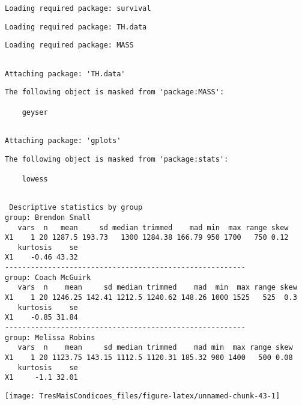 \documentclass[]{article}
\begin{document}
\begin{verbatim}
Loading required package: survival
\end{verbatim}

\begin{verbatim}
Loading required package: TH.data
\end{verbatim}

\begin{verbatim}
Loading required package: MASS
\end{verbatim}

\begin{verbatim}

Attaching package: 'TH.data'
\end{verbatim}

\begin{verbatim}
The following object is masked from 'package:MASS':

    geyser
\end{verbatim}

\begin{verbatim}

Attaching package: 'gplots'
\end{verbatim}

\begin{verbatim}
The following object is masked from 'package:stats':

    lowess
\end{verbatim}

\begin{verbatim}

 Descriptive statistics by group 
group: Brendon Small
   vars  n   mean     sd median trimmed    mad min  max range skew
X1    1 20 1287.5 193.73   1300 1284.38 166.79 950 1700   750 0.12
   kurtosis    se
X1    -0.46 43.32
-------------------------------------------------------- 
group: Coach McGuirk
   vars  n    mean     sd median trimmed    mad  min  max range skew
X1    1 20 1246.25 142.41 1212.5 1240.62 148.26 1000 1525   525  0.3
   kurtosis    se
X1    -0.85 31.84
-------------------------------------------------------- 
group: Melissa Robins
   vars  n    mean     sd median trimmed    mad min  max range skew
X1    1 20 1123.75 143.15 1112.5 1120.31 185.32 900 1400   500 0.08
   kurtosis    se
X1     -1.1 32.01
\end{verbatim}

\begin{center}\texttt{[image: TresMaisCondicoes\_files/figure-latex/unnamed-chunk-43-1]} \end{center}
\end{document}
